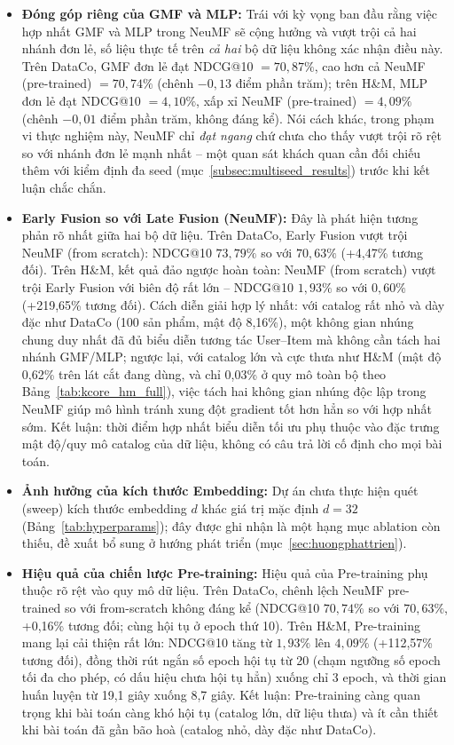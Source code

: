 \begin{itemize}
    \item \textbf{Đóng góp riêng của GMF và MLP:} Trái với kỳ vọng ban đầu rằng việc hợp nhất GMF và MLP trong NeuMF sẽ cộng hưởng và vượt trội cả hai nhánh đơn lẻ, số liệu thực tế trên \emph{cả hai} bộ dữ liệu không xác nhận điều này. Trên DataCo, GMF đơn lẻ đạt NDCG@10 $=70,87\%$, cao hơn cả NeuMF (pre-trained) $=70,74\%$ (chênh $-0,13$ điểm phần trăm); trên H\&M, MLP đơn lẻ đạt NDCG@10 $=4,10\%$, xấp xỉ NeuMF (pre-trained) $=4,09\%$ (chênh $-0,01$ điểm phần trăm, không đáng kể). Nói cách khác, trong phạm vi thực nghiệm này, NeuMF chỉ \emph{đạt ngang} chứ chưa cho thấy vượt trội rõ rệt so với nhánh đơn lẻ mạnh nhất -- một quan sát khách quan cần đối chiếu thêm với kiểm định đa seed (mục~\ref{subsec:multiseed_results}) trước khi kết luận chắc chắn.
    \item \textbf{Early Fusion so với Late Fusion (NeuMF):} Đây là phát hiện tương phản rõ nhất giữa hai bộ dữ liệu. Trên DataCo, Early Fusion vượt trội NeuMF (from scratch): NDCG@10 $73,79\%$ so với $70,63\%$ (+4,47\% tương đối). Trên H\&M, kết quả đảo ngược hoàn toàn: NeuMF (from scratch) vượt trội Early Fusion với biên độ rất lớn -- NDCG@10 $1,93\%$ so với $0,60\%$ (+219,65\% tương đối). Cách diễn giải hợp lý nhất: với catalog rất nhỏ và dày đặc như DataCo (100 sản phẩm, mật độ 8,16\%), một không gian nhúng chung duy nhất đã đủ biểu diễn tương tác User--Item mà không cần tách hai nhánh GMF/MLP; ngược lại, với catalog lớn và cực thưa như H\&M (mật độ 0,62\% trên lát cắt đang dùng, và chỉ 0,03\% ở quy mô toàn bộ theo Bảng~\ref{tab:kcore_hm_full}), việc tách hai không gian nhúng độc lập trong NeuMF giúp mô hình tránh xung đột gradient tốt hơn hẳn so với hợp nhất sớm. Kết luận: thời điểm hợp nhất biểu diễn tối ưu phụ thuộc vào đặc trưng mật độ/quy mô catalog của dữ liệu, không có câu trả lời cố định cho mọi bài toán.
    \item \textbf{Ảnh hưởng của kích thước Embedding:} Dự án chưa thực hiện quét (sweep) kích thước embedding $d$ khác giá trị mặc định $d=32$ (Bảng~\ref{tab:hyperparams}); đây được ghi nhận là một hạng mục ablation còn thiếu, đề xuất bổ sung ở hướng phát triển (mục~\ref{sec:huongphattrien}).
    \item \textbf{Hiệu quả của chiến lược Pre-training:} Hiệu quả của Pre-training phụ thuộc rõ rệt vào quy mô dữ liệu. Trên DataCo, chênh lệch NeuMF pre-trained so với from-scratch không đáng kể (NDCG@10 $70,74\%$ so với $70,63\%$, +0,16\% tương đối; cùng hội tụ ở epoch thứ 10). Trên H\&M, Pre-training mang lại cải thiện rất lớn: NDCG@10 tăng từ $1,93\%$ lên $4,09\%$ (+112,57\% tương đối), đồng thời rút ngắn số epoch hội tụ từ 20 (chạm ngưỡng số epoch tối đa cho phép, có dấu hiệu chưa hội tụ hẳn) xuống chỉ 3 epoch, và thời gian huấn luyện từ 19,1 giây xuống 8,7 giây. Kết luận: Pre-training càng quan trọng khi bài toán càng khó hội tụ (catalog lớn, dữ liệu thưa) và ít cần thiết khi bài toán đã gần bão hoà (catalog nhỏ, dày đặc như DataCo).
\end{itemize}

